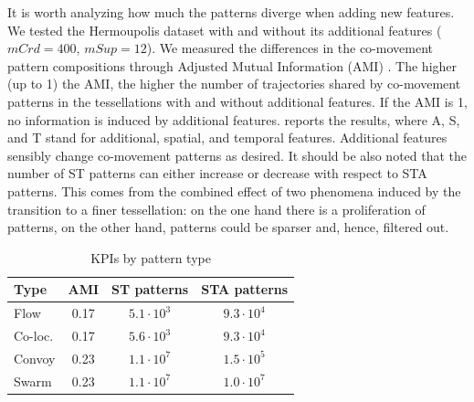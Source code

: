 \documentclass[
]{ceurart}
\renewcommand{\sf}[1]{\textsf{\textup{#1}}}
\begin{document}
It is worth analyzing how much the patterns diverge when adding new features.
We tested the \sf{Hermoupolis} dataset with and without its additional features ($mCrd=400$, $mSup=12$).
We measured the differences in the co-movement pattern compositions through Adjusted Mutual Information (AMI) \citep{vinh2010information}.
The higher (up to 1) the AMI, the higher the number of trajectories shared by co-movement patterns in the tessellations with and without additional features.
If the AMI is 1, no information is induced by additional features.
 reports the results, where A, S, and T stand for additional, spatial, and temporal features.
Additional features sensibly change co-movement patterns as desired.
It should be also noted that the number of ST patterns can either increase or decrease with respect to STA patterns.
This comes from the combined effect of two phenomena induced by the transition to a finer tessellation: on the one hand there is a proliferation of patterns, on the other hand, patterns could be sparser and, hence, filtered out.



\begin{table}[t]
\centering
\footnotesize
\caption{KPIs by pattern type}
\label{tab:ami}%
\begin{tabular}{lccc}
\toprule
Type    & AMI  & ST patterns & STA patterns\\
\midrule
Flow    & 0.17 & $5.1\cdot10^{3}$ & $9.3 \cdot 10^4$ \\
Co-loc. & 0.17 & $5.6\cdot10^{3}$ & $9.3 \cdot 10^4$ \\
Convoy  & 0.23 & $1.1\cdot10^{7}$ & $1.5 \cdot 10^5$ \\
Swarm   & 0.23 & $1.1\cdot10^{7}$ & $1.0 \cdot 10^7$ \\
\bottomrule
\end{tabular}%
\end{table}%
\end{document}
